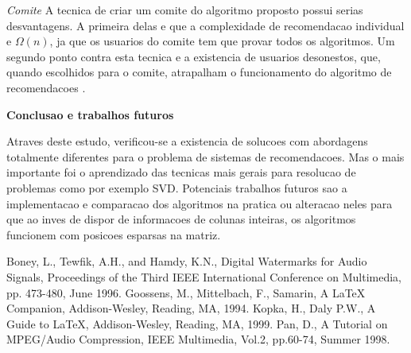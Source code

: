\documentclass[a4paper,10pt]{article}
\begin{document}
\textit{Comite}
A tecnica de criar um comite do algoritmo proposto possui serias
desvantagens. 
A primeira delas e que a complexidade de recomendacao individual
e $\Omega(n)$, ja que os usuarios do comite tem que provar todos os
algoritmos. 
Um segundo ponto contra esta tecnica e a existencia de usuarios desonestos,
que, quando escolhidos para o comite, atrapalham o funcionamento do 
algoritmo de recomendacoes \cite{Boney96}.

\textbf{Conclusao e trabalhos futuros}

Atraves deste estudo, verificou-se a existencia de solucoes com abordagens
totalmente diferentes para o problema de sistemas de recomendacoes. Mas o mais
importante foi o aprendizado das tecnicas mais gerais para resolucao de problemas
como por exemplo SVD. 
Potenciais trabalhos futuros sao a implementacao e comparacao dos algoritmos na pratica
ou alteracao neles para que ao inves de dispor de informacoes de colunas inteiras, os
algoritmos funcionem com posicoes esparsas na matriz. 


\begin{thebibliography}
     Boney, L., Tewfik, A.H., and Hamdy, K.N., Digital Watermarks for Audio Signals, Proceedings of the Third IEEE International Conference on Multimedia, pp. 473-480, June 1996.
     Goossens, M., Mittelbach, F., Samarin, A LaTeX Companion, Addison-Wesley, Reading, MA, 1994.
     Kopka, H., Daly P.W., A Guide to LaTeX, Addison-Wesley, Reading, MA, 1999.
     Pan, D., A Tutorial on MPEG/Audio Compression, IEEE Multimedia, Vol.2, pp.60-74, Summer 1998.
\end{thebibliography}
\end{document}
